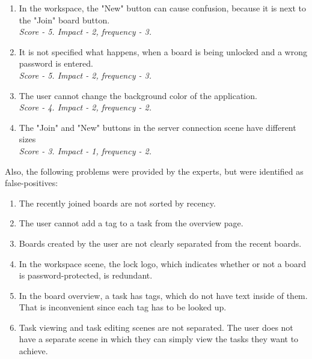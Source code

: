 \begin{enumerate}
  \item In the workspace, the "New" button can cause confusion, because it is next to the "Join" board button.
  \\ \emph{Score - 5. Impact - 2, frequency - 3.} \\

  \item It is not specified what happens, when a board is being unlocked and a wrong password is entered.
  \\ \emph{Score - 5. Impact - 2, frequency - 3.} \\

  \item The user cannot change the background color of the application.
  \\ \emph{Score - 4. Impact - 2, frequency - 2.} \\

 \item The "Join" and "New" buttons in the server connection scene have different sizes
  \\ \emph{Score - 3. Impact - 1, frequency - 2.} \\


  
\end{enumerate}

Also, the following problems were provided by the experts, but were identified as false-positives:

\begin{enumerate}

    \item The recently joined boards are not sorted by recency.
    \item The user cannot add a tag to a task from the overview page.
    \item Boards created by the user are not clearly separated from the recent boards.
    \item In the workspace scene, the lock logo, which indicates whether or not a board is password-protected, is redundant.
    \item In the board overview, a task has tags, which do not have text inside of them. That is inconvenient since each tag has to be looked up.
    \item Task viewing and task editing scenes are not separated. The user does not have a separate scene in which they can simply view the tasks they want to achieve.

\end{enumerate}

